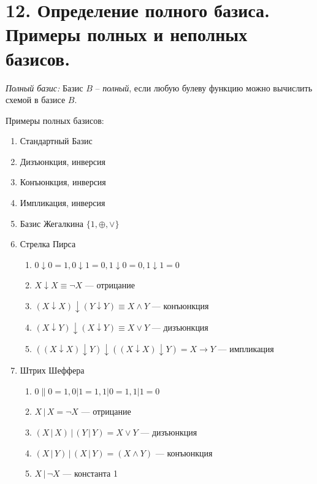 \section*{12. Определение полного базиса. Примеры полных и неполных базисов.}

\textit{Полный базис: } Базис $B$ -- \textit{полный}, если любую булеву функцию можно вычислить схемой в базисе $B$.

Примеры полных базисов:

\begin{enumerate}
	\item Стандартный Базис
	\item Дизъюнкция, инверсия
	\item Конъюнкция, инверсия
	\item Импликация, инверсия
	\item Базис Жегалкина $\lbrace 	1, \oplus, \vee \rbrace$
	\item Стрелка Пирса
	\begin{enumerate}
		\item $0 \downarrow 0 = 1, 0 \downarrow 1 = 0, 1 \downarrow 0 = 0, 1 \downarrow 1 = 0$
		\item $X \downarrow X \equiv \neg X$  — отрицание
		\item $\left( {X \downarrow X} \right) \downarrow \left( {Y \downarrow Y } \right) \equiv {X  \wedge Y }$  — конъюнкция
		\item $\left( {X \downarrow Y} \right) \downarrow \left( {X \downarrow Y} \right) \equiv X \vee Y$  — дизъюнкция
		\item $\left( \left( {X \downarrow X } \right) \downarrow Y \right) \downarrow \left( \left( {X \downarrow X } \right) \downarrow Y \right) = X \rightarrow Y$  — импликация
	\end{enumerate}
	\item Штрих Шеффера
	\begin{enumerate}
		\item $0 \| 0 = 1, 0 | 1 = 1, 1 | 0 = 1, 1 | 1 = 0$
		\item $X\,|\,X  = \neg X$  — отрицание
		\item $\left( {X \,|\,X } \right)\,|\,\left( {Y \,|\,Y } \right) = X \vee Y$  — дизъюнкция
		\item $\left( {X \,|\,Y } \right)\,|\,\left( {X \,|\,Y } \right) = \left( {X  \wedge Y } \right)$  — конъюнкция
		\item $X \,|\, \neg X$  — константа 1
	\end{enumerate}
\end{enumerate}

